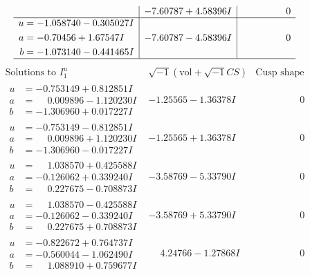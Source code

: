 \documentclass[1p]{elsarticle_modified}
\theoremstyle{definition}
\newcommand{\I}{\sqrt{-1}}
\begin{document}
$$\begin{array}{c|c|c}
 & -7.60787 + 4.58396 I & \phantom{-0.000000 } 0 \\ \hline\begin{aligned}
u &= -1.058740 - 0.305027 I \\
a &= -0.70456 + 1.67547 I \\
b &= -1.073140 - 0.441465 I\end{aligned}
 & -7.60787 - 4.58396 I & \phantom{-0.000000 } 0\\
 \hline 
 \end{array}$$\newpage$$\begin{array}{c|c|c}  
\text{Solutions to }I^u_{1}& \I (\text{vol} + \sqrt{-1}CS) & \text{Cusp shape}\\
 \hline 
\begin{aligned}
u &= -0.753149 + 0.812851 I \\
a &= \phantom{-}0.009896 - 1.120230 I \\
b &= -1.306960 + 0.017227 I\end{aligned}
 & -1.25565 - 1.36378 I & \phantom{-0.000000 } 0 \\ \hline\begin{aligned}
u &= -0.753149 - 0.812851 I \\
a &= \phantom{-}0.009896 + 1.120230 I \\
b &= -1.306960 - 0.017227 I\end{aligned}
 & -1.25565 + 1.36378 I & \phantom{-0.000000 } 0 \\ \hline\begin{aligned}
u &= \phantom{-}1.038570 + 0.425588 I \\
a &= -0.126062 + 0.339240 I \\
b &= \phantom{-}0.227675 - 0.708873 I\end{aligned}
 & -3.58769 - 5.33790 I & \phantom{-0.000000 } 0 \\ \hline\begin{aligned}
u &= \phantom{-}1.038570 - 0.425588 I \\
a &= -0.126062 - 0.339240 I \\
b &= \phantom{-}0.227675 + 0.708873 I\end{aligned}
 & -3.58769 + 5.33790 I & \phantom{-0.000000 } 0 \\ \hline\begin{aligned}
u &= -0.822672 + 0.764737 I \\
a &= -0.560044 - 1.062490 I \\
b &= \phantom{-}1.088910 + 0.759677 I\end{aligned}
 & \phantom{-}4.24766 - 1.27868 I & \phantom{-0.000000 } 0 \\ \hline\begin{aligned}

\end{aligned}
\end{array}$$
\end{document}
